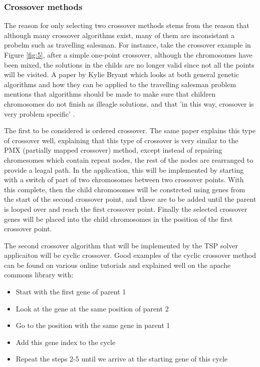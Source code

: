 \documentclass[article]{IEEEtran}
\begin{document}
\subsubsection{Crossover methods}
The reason for only selecting two crossover methods stems from the reason that although many crossover algorithms exist, many of them are inconsistant a probelm such as travelling salesman. For instance, take the crossover example in Figure \ref{fig:5}, after a simple one-point crossover, although the chromosomes have been mixed, the solutions in the childs are no longer valid since not all the points will be visited. A paper by Kylie Bryant which looks at both general genetic algorithms and how they can be applied to the travelling salesman problem mentions that algorithms should be made to make sure that children chromosomes do not finish as illeagle solutions, and that 'in this way, crossover is very problem specific' \cite{7}. \par
The first to be considered is ordered crossover. The same paper explains this type of crossover well, explaining that this type of crossover is very similar to the PMX (partially mapped crossover) method, except instead of repairing chromesomes which contain repeat nodes, the rest of the nodes are rearranged to provide a leagal path. In the application, this will be implemented by starting with a switch of part of two chromosomes between two crossover points. With this complete, then the child chromosomes will be constrcted using genes from the start of the second crossover point, and these are to be  added until the parent is looped over and reach the first crossover point. Finally the selected crossover genes will be placed into the child chromosomes in the position of the first crossover point.\par
The second crossover algorithm that will be implemented by the TSP solver applicaiton will be cyclic crossover. Good examples of the cyclic crossover method can be found on various online tutorials \cite{8} and explained well on the apache commons library\cite{9} with:
\begin{itemize}
\item Start with the first gene of parent 1
\item Look at the gene at the same position of parent 2
\item Go to the position with the same gene in parent 1
\item Add this gene index to the cycle
\item Repeat the steps 2-5 until we arrive at the starting gene of this cycle
\end{itemize}
\end{document}
